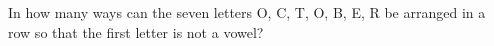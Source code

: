 In how many ways can the seven letters O, C, T, O, B, E, R be arranged in a row so that the first letter is not a vowel?
